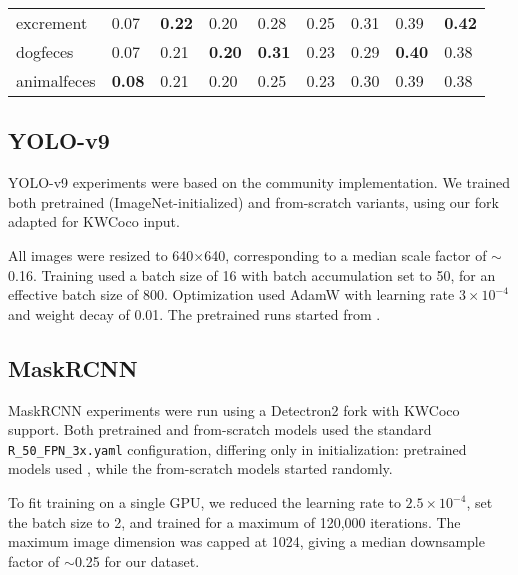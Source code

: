\begin{table*}[t]
\begin{tabular}{lllllllll}
 excrement   & 0.07                 & \textbf{0.22}         & 0.20                 & 0.28                  & 0.25                 & 0.31                  & 0.39                 & \textbf{0.42}         \\
 dogfeces    & 0.07                 & 0.21                  & \textbf{0.20}        & \textbf{0.31}         & 0.23                 & 0.29                  & \textbf{0.40}        & 0.38                  \\
 animalfeces & \textbf{0.08}        & 0.21                  & 0.20                 & 0.25                  & 0.23                 & 0.30                  & 0.39                 & 0.38                  \\
\bottomrule
\end{tabular}
\ifwacv \CaptionPrompt \fi
\end{table*}


\subsection{YOLO-v9}

YOLO-v9 experiments were based on the community  implementation.
We trained both pretrained (ImageNet-initialized) and from-scratch variants, using our fork adapted for
  KWCoco input.

All images were resized to 640$\times$640, corresponding to a median scale factor of $\sim$0.16.
Training used a batch size of 16 with batch accumulation set to 50, for an effective batch size of 800.
Optimization used AdamW with learning rate $3\times10^{-4}$ and weight decay of 0.01.
The pretrained runs started from \YOLOPretrained{}.


\subsection{MaskRCNN}

MaskRCNN experiments were run using a Detectron2 fork with KWCoco support.
Both pretrained and from-scratch models used the standard \texttt{R\_50\_FPN\_3x.yaml} configuration,
  differing only in initialization:
pretrained models used \MaskRCNNPretrained{}, while the from-scratch models started randomly.

To fit training on a single GPU, we reduced the learning rate to $2.5\times10^{-4}$, set the batch size to
  2, and trained for a maximum of 120{,}000 iterations.
The maximum image dimension was capped at 1024, giving a median downsample factor of $\sim$0.25 for our
  dataset.


